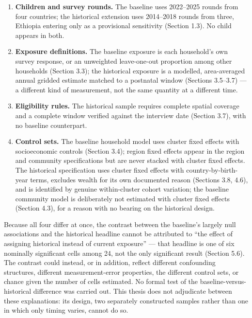 \begin{enumerate}
\def\labelenumi{\arabic{enumi}.}
\tightlist
\item
  \textbf{Children and survey rounds.} The baseline uses 2022--2025 rounds from four countries; the historical extension uses 2014--2018 rounds from three, Ethiopia entering only as a provisional sensitivity (Section 1.3). No child appears in both.
\item
  \textbf{Exposure definitions.} The baseline exposure is each household's own survey response, or an unweighted leave-one-out proportion among other households (Section 3.3); the historical exposure is a modelled, area-averaged annual gridded estimate matched to a postnatal window (Sections 3.5--3.7) --- a different kind of measurement, not the same quantity at a different time.
\item
  \textbf{Eligibility rules.} The historical sample requires complete spatial coverage and a complete window verified against the interview date (Section 3.7), with no baseline counterpart.
\item
  \textbf{Control sets.} The baseline household model uses cluster fixed effects with socioeconomic controls (Section 3.4); region fixed effects appear in the region and community specifications but are never stacked with cluster fixed effects. The historical specification uses cluster fixed effects with country-by-birth-year terms, excludes wealth for its own documented reason (Sections 3.8, 4.6), and is identified by genuine within-cluster cohort variation; the baseline community model is deliberately not estimated with cluster fixed effects (Section 4.3), for a reason with no bearing on the historical design.
\end{enumerate}

Because all four differ at once, the contrast between the baseline's largely null associations and the historical headline cannot be attributed to ``the effect of assigning historical instead of current exposure'' --- that headline is one of six nominally significant cells among 24, not the only significant result (Section 5.6). The contrast could instead, or in addition, reflect different confounding structures, different measurement-error properties, the different control sets, or chance given the number of cells estimated. No formal test of the baseline-versus-historical difference was carried out. This thesis does not adjudicate between these explanations: its design, two separately constructed samples rather than one in which only timing varies, cannot do so.

